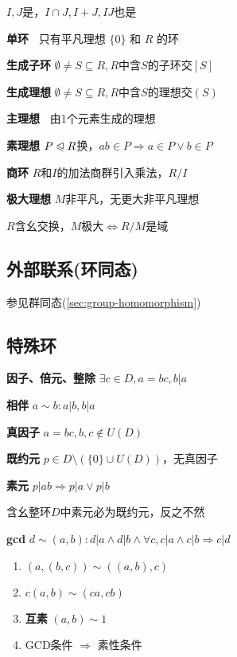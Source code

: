 \documentclass[a4paper,10pt]{ctexart}
\newcommand*{\impl}{\Rightarrow}
\renewcommand*{\iff}{\Leftrightarrow}
\newcommand*{\nmsubgroupeq}{\trianglelefteqslant}
\newcommand*{\genring}[1]{[#1]}
\newcommand*{\genideal}[1]{(#1)}
\begin{document}
\begin{multicols}{3}
    \begin{theorem}[理想运算律]
        $I, J$是，$I \cap J, I + J, IJ$也是
    \end{theorem}

    \textbf{单环\ } 只有平凡理想 $\{0\}$ 和 $R$ 的环

    \textbf{生成子环} $\emptyset \!\neq\! S \!\subseteq\! R, R$中含$\!S\!$的子环交$\genring{S}$

    \textbf{生成理想} $\emptyset \!\neq\! S \!\subseteq\! R, R$中含$\!S\!$的理想交$\genideal{S}$

    \textbf{主理想\ } 由1个元素生成的理想

    \textbf{素理想} $P \nmsubgroupeq R$换，$ab \in P \impl a \in P \vee b \in P$

    \textbf{商环} $R$和$I$的加法商群引入乘法，$R/I$

    \textbf{极大理想} $M$非平凡，无更大非平凡理想

    $R$含幺交换，$M$极大$\iff R/M$是域

    \subsection{外部联系(环同态)}

    参见群同态(\ref{sec:group-homomorphism})

    \subsection{特殊环}

    \textbf{因子、倍元、整除} $\exists c \in D, a = bc, b | a$

    \textbf{相伴} $a \sim b: a | b, b | a$

    \textbf{真因子} $a = bc, b, c \notin U(D)$

    \textbf{既约元} $p \in D \setminus (\{ 0 \} \cup U(D))$，无真因子

    \textbf{素元} $p | ab \impl p | a \vee p | b$

    含幺整环$D$中素元必为既约元，反之不然

    \textbf{gcd} $d \sim (a, b): d|a \wedge d|b \wedge \forall c, c|a \wedge c|b \impl c|d$

    \begin{theorem}[gcd性质]
        \hfil

        \begin{enumerate}
            \item $(a, (b, c)) \sim ((a, b), c)$
            \item $c(a, b) \sim (ca, cb)$
            \item \textbf{互素} $(a, b) \sim 1$
            \item GCD条件 $\impl$ 素性条件
        \end{enumerate}
    \end{theorem}


\end{multicols}
\end{document}
